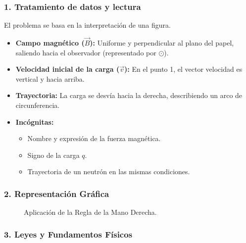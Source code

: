 \subsubsection*{1. Tratamiento de datos y lectura}
El problema se basa en la interpretación de una figura.
\begin{itemize}
    \item \textbf{Campo magnético ($\vec{B}$):} Uniforme y perpendicular al plano del papel, saliendo hacia el observador (representado por $\odot$).
    \item \textbf{Velocidad inicial de la carga ($\vec{v}$):} En el punto 1, el vector velocidad es vertical y hacia arriba.
    \item \textbf{Trayectoria:} La carga se desvía hacia la derecha, describiendo un arco de circunferencia.
    \item \textbf{Incógnitas:}
    \begin{itemize}
        \item Nombre y expresión de la fuerza magnética.
        \item Signo de la carga $q$.
        \item Trayectoria de un neutrón en las mismas condiciones.
    \end{itemize}
\end{itemize}

\subsubsection*{2. Representación Gráfica}
\begin{figure}[H]
    \centering
    \caption{Aplicación de la Regla de la Mano Derecha.}
\end{figure}

\subsubsection*{3. Leyes y Fundamentos Físicos}
